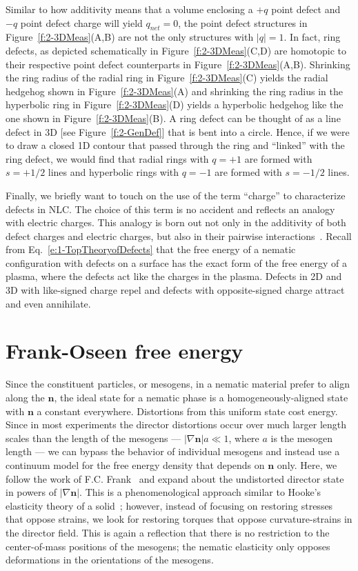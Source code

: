 Similar to how additivity means that a volume enclosing a $+q$ point defect and $-q$ point defect charge will yield $q_{net} = 0$, the point defect structures in Figure~\ref{f:2-3DMeas}(A,B) are not the only structures with $|q| = 1$.
In fact, ring defects, as depicted schematically in Figure~\ref{f:2-3DMeas}(C,D) are homotopic to their respective point defect counterparts in Figure~\ref{f:2-3DMeas}(A,B).
Shrinking the ring radius of the radial ring in Figure~\ref{f:2-3DMeas}(C) yields the radial hedgehog shown in Figure~\ref{f:2-3DMeas}(A) and shrinking the ring radius in the hyperbolic ring in Figure~\ref{f:2-3DMeas}(D) yields a hyperbolic hedgehog like the one shown in Figure~\ref{f:2-3DMeas}(B).
A ring defect can be thought of as a line defect in 3D [see Figure~\ref{f:2-GenDef}] that is bent into a circle.
Hence, if we were to draw a closed 1D contour that passed through the ring and ``linked'' with the ring defect, we would find that radial rings with $q = +1$ are formed with $s = +1/2$ lines and hyperbolic rings with $q = -1$ are formed with $s = -1/2$ lines.

Finally, we briefly want to touch on the use of the term ``charge'' to characterize defects in NLC.\@
The choice of this term is no accident and reflects an analogy with electric charges.
This analogy is born out not only in the additivity of both defect charges and electric charges, but also in their pairwise interactions~\cite{RN33,RN175,RN207}.
Recall from Eq.~\ref{e:1-TopTheoryofDefects} that the free energy of a nematic configuration with defects on a surface has the exact form of the free energy of a plasma, where the defects act like the charges in the plasma.
Defects in 2D and 3D with like-signed charge repel and defects with opposite-signed charge attract and even annihilate.




\section{Frank-Oseen free energy}
Since the constituent particles, or mesogens, in a nematic material prefer to align along the $\mathbf{n}$, the ideal state for a nematic phase is a homogeneously-aligned state with $\mathbf{n}$ a constant everywhere.
Distortions from this uniform state cost energy.
Since in most experiments the director distortions occur over much larger length scales than the length of the mesogens --- $|\nabla \mathbf{n}| a \ll 1$, where $a$ is the mesogen length --- we can bypass the behavior of individual mesogens and instead use a continuum model for the free energy density that depends on $\mathbf{n}$ only.
Here, we follow the work of F.C. Frank~\cite{RN61} and expand about the undistorted director state in powers of $|\nabla \mathbf{n}|$.
This is a phenomenological approach similar to Hooke's elasticity theory of a solid~\cite{RN175,RN178}; however, instead of focusing on restoring stresses that oppose strains, we look for restoring torques that oppose curvature-strains in the director field.
This is again a reflection that there is no restriction to the center-of-mass positions of the mesogens; the nematic elasticity only opposes deformations in the orientations of the mesogens.

